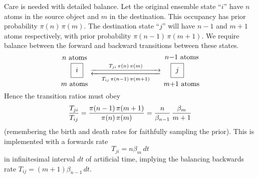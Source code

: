 Care is needed with detailed balance.
Let the original ensemble state ``$i$'' have $n$ atoms in the source object and $m$ in the destination.
This occupancy has prior probability $\pi(n)\,\pi(m)$.
The destination state ``$j$'' will have $n-1$ and $m+1$ atoms respectively, with prior probability $\pi(n-1)\,\pi(m+1)$.
We require balance between the forward and backward transitions between these states.
$$
\lower 8pt\vbox{ \hbox{$\,n$ atoms}
                 \vskip 4pt
                 \hbox{\hskip 14pt \vbox{\offinterlineskip
                                         \hrule
                                         \halign{    & \vrule#&\strut\ \ \hfil#\hfil\ &\vrule#\cr
                                           height4pt &  \omit &                       & \omit \cr
                                                              &         $i$           &       \cr
                                           height4pt &  \omit &                       & \omit \cr
                                                }
                                         \hrule
                                        }
                      }
                 \hbox{$m$ atoms}
               }
\hskip 4pt
\vbox{ \hbox{${\buildrel     T_{ji}\,\pi(n)\,\pi(m)                      \over      {\hbox to 100pt{\rightarrowfill}}}     $}
       \hbox{${\buildrel {\displaystyle{\hbox to 100pt{\leftarrowfill}}} \over {\scriptstyle{T_{ij}\,\pi(n-1)\,\pi(m+1)}}} $}
     }
\hskip 4pt
\lower 8pt\vbox{ \hbox{$\,n-$1 atoms}
                 \vskip 4pt
                 \hbox{\hskip 10pt \vbox{\offinterlineskip
                                         \hrule
                                         \halign{    & \vrule#&\strut\ \ \hfil#\hfil\ &\vrule#\cr
                                           height4pt &  \omit &                       & \omit \cr
                                                              &         $j$           &       \cr
                                           height4pt &  \omit &                       & \omit \cr
                                                }
                                         \hrule
                                        }
                      }
                  \hbox{$m+$1 atoms}
                }
$$
Hence the transition ratios must obey
$$
   {T_{ji} \over T_{ij}} = {\pi(n-1)\,\pi(m+1) \over \pi(n)\,\pi(m)} = {n \over \beta_{n-1}}\,{\beta_m \over m+1}
$$
(remembering the birth and death rates for faithfully sampling the prior).  This is implemented with a forwards rate
$$
    T_{ji} = n \beta_m\,dt
$$
in infinitesimal interval $dt$ of artificial time, implying the balancing backwards rate $T_{ij} = (m+1) \beta_{n-1}\,dt$.
